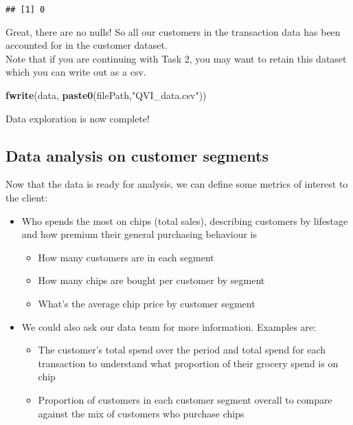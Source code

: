 \documentclass[]{article}
\newenvironment{Shaded}{\begin{snugshade}}{\end{snugshade}}
\newcommand{\KeywordTok}[1]{\textcolor[rgb]{0.13,0.29,0.53}{\textbf{#1}}}
\newcommand{\NormalTok}[1]{#1}
\newcommand{\StringTok}[1]{\textcolor[rgb]{0.31,0.60,0.02}{#1}}
\providecommand{\tightlist}{%
  \setlength{\itemsep}{0pt}\setlength{\parskip}{0pt}}
\begin{document}
\begin{verbatim}
## [1] 0
\end{verbatim}

Great, there are no nulls! So all our customers in the transaction data
has been accounted for in the customer dataset.\\
Note that if you are continuing with Task 2, you may want to retain this
dataset which you can write out as a csv.

\begin{Shaded}
\begin{Highlighting}[]
\KeywordTok{fwrite}\NormalTok{(data, }\KeywordTok{paste0}\NormalTok{(filePath,}\StringTok{"QVI_data.csv"}\NormalTok{))}
\end{Highlighting}
\end{Shaded}

Data exploration is now complete!

\hypertarget{data-analysis-on-customer-segments}{%
\subsection{Data analysis on customer
segments}\label{data-analysis-on-customer-segments}}

Now that the data is ready for analysis, we can define some metrics of
interest to the client:

\begin{itemize}
\item
  Who spends the most on chips (total sales), describing customers by
  lifestage and how premium their general purchasing behaviour is

  \begin{itemize}
  \tightlist
  \item
    How many customers are in each segment
  \item
    How many chips are bought per customer by segment
  \item
    What's the average chip price by customer segment
  \end{itemize}
\item
  We could also ask our data team for more information. Examples are:

  \begin{itemize}
  \tightlist
  \item
    The customer's total spend over the period and total spend for each
    transaction to understand what proportion of their grocery spend is
    on chip
  \item
    Proportion of customers in each customer segment overall to compare
    against the mix of customers who purchase chips
  \end{itemize}
\end{itemize}
\end{document}
